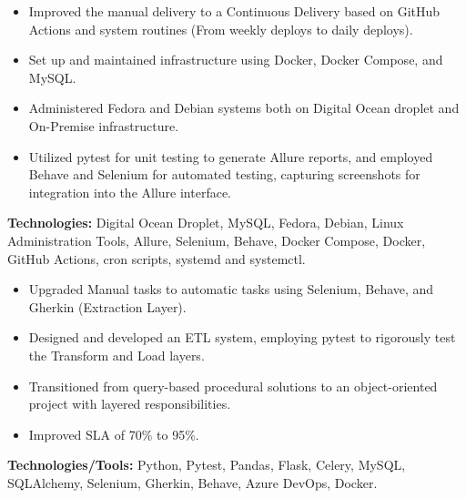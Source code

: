 \documentclass[10pt,a4paper]{altacv}
\begin{document}
\vspace{5mm}

\begin{itemize}
    \setlength{\itemindent}{0.5em}
    \item[--] Improved the manual delivery to a Continuous Delivery based on GitHub Actions and system routines (From weekly deploys to daily deploys).
    \item[--] Set up and maintained infrastructure using Docker, Docker Compose, and MySQL.
    \item[--] Administered Fedora and Debian systems both on Digital Ocean droplet and On-Premise infrastructure.
    \item[--] Utilized pytest for unit testing to generate Allure reports, and employed Behave and Selenium for automated testing, capturing screenshots for integration into the Allure interface.
\end{itemize}
\textbf{Technologies:} Digital Ocean Droplet, MySQL, Fedora, Debian, Linux Administration Tools, Allure, Selenium, Behave, Docker Compose, Docker, GitHub Actions, cron scripts, systemd and systemctl.
\vspace{5mm}


\begin{itemize}
    \setlength{\itemindent}{0.5em}
    \item[--] Upgraded Manual tasks to automatic tasks using Selenium, Behave, and Gherkin (Extraction Layer).
    \item[--] Designed and developed an ETL system, employing pytest to rigorously test the Transform and Load layers.
    \item[--] Transitioned from query-based procedural solutions to an object-oriented project with layered responsibilities.
    \item[--] Improved SLA of 70\% to 95\%.
\end{itemize}
\textbf{Technologies/Tools:} Python, Pytest, Pandas, Flask, Celery, MySQL, SQLAlchemy, Selenium, Gherkin, Behave, Azure DevOps, Docker.
\vspace{5mm}
\end{document}
